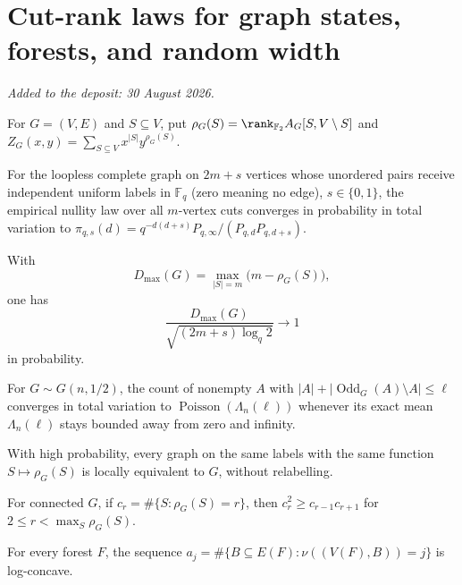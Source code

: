 \part{Cut-rank laws for graph states, forests, and random width}

\medskip\noindent\emph{Added to the deposit: 30 August 2026.}\par\medskip

For $G=(V,E)$ and $S\subseteq V$, put
$\rho_G(S)=\rank_{\mathbb F_2}A_G[S,V\setminus S]$ and
$Z_G(x,y)=\sum_{S\subseteq V}x^{|S|}y^{\rho_G(S)}$.

\begin{conjecture}\label{as1}
For the loopless complete graph on $2m+s$ vertices whose unordered pairs
receive independent uniform labels in $\mathbb F_q$ (zero meaning no edge),
$s\in\{0,1\}$, the empirical nullity law over all $m$-vertex cuts converges
in probability in total variation to
$\pi_{q,s}(d)=q^{-d(d+s)}P_{q,\infty}/(P_{q,d}P_{q,d+s})$.
\end{conjecture}
\begin{conjecture}\label{as2}
With
\[
 D_{\max}(G)=\max_{|S|=m}\bigl(m-\rho_G(S)\bigr),
\]
one has
\[
 \frac{D_{\max}(G)}{\sqrt{(2m+s)\log_q2}}\longrightarrow1
\]
in probability.
\end{conjecture}
\begin{conjecture}\label{as3}
For $G\sim G(n,1/2)$, the count of nonempty $A$ with
$|A|+|\operatorname{Odd}_G(A)\setminus A|\le\ell$ converges in total
variation to $\operatorname{Poisson}(\Lambda_n(\ell))$ whenever its exact
mean $\Lambda_n(\ell)$ stays bounded away from zero and infinity.
\end{conjecture}
\begin{conjecture}\label{as4}
With high probability, every graph on the same labels with the same function
$S\mapsto\rho_G(S)$ is locally equivalent to $G$, without relabelling.
\end{conjecture}
\begin{conjecture}\label{as5}
For connected $G$, if $c_r=\#\{S:\rho_G(S)=r\}$, then
$c_r^2\ge c_{r-1}c_{r+1}$ for $2\le r<\max_S\rho_G(S)$.
\end{conjecture}
\begin{conjecture}\label{as6}
For every forest $F$, the sequence
$a_j=\#\{B\subseteq E(F):\nu((V(F),B))=j\}$ is log-concave.
\end{conjecture}
